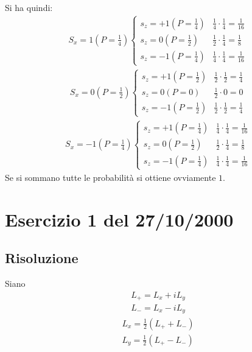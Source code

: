 Si ha quindi:
\begin{equation}\begin{split}
S_x=1 \left(P=\frac{1}{4}\right)
\begin{cases}
s_z=+1 \left(P=\frac{1}{4}\right)&\frac{1}{4}\cdot \frac{1}{4}=\frac{1}{16} \\
s_z=0 \left(P=\frac{1}{2}\right)&\frac{1}{2}\cdot \frac{1}{4}=\frac{1}{8} \\
s_z=-1 \left(P=\frac{1}{4}\right)&\frac{1}{4}\cdot \frac{1}{4}=\frac{1}{16}
\end{cases}
\end{split}\end{equation}
\begin{equation}\begin{split}
S_x=0 \left(P=\frac{1}{2}\right)
\begin{cases}
s_z=+1 \left(P=\frac{1}{2}\right)&\frac{1}{2}\cdot \frac{1}{2}=\frac{1}{4}\\
s_z=0 \left(P=0\right)&\frac{1}{2}\cdot 0=0\\
s_z=-1 \left(P=\frac{1}{2}\right)&\frac{1}{2}\cdot \frac{1}{2}=\frac{1}{4}
\end{cases}
\end{split}\end{equation}
\begin{equation}\begin{split}
S_x=-1 \left(P=\frac{1}{4}\right)
\begin{cases}
s_z=+1 \left(P=\frac{1}{4}\right)&\frac{1}{4}\cdot \frac{1}{4}=\frac{1}{16}\\
s_z=0 \left(P=\frac{1}{2}\right)&\frac{1}{2}\cdot \frac{1}{4}=\frac{1}{8}\\
s_z=-1 \left(P=\frac{1}{4}\right)&\frac{1}{4}\cdot \frac{1}{4}=\frac{1}{16}
\end{cases}
\end{split}\end{equation}
Se si sommano tutte le probabilità si ottiene ovviamente $1$.

\section{Esercizio 1 del 27/10/2000} %

\subsection{Risoluzione} %
Siano
\begin{equation}\begin{split}
L_+=L_x+iL_y \\
L_-=L_x-iL_y
\end{split}\end{equation}
\begin{equation}\begin{split}
L_x=\frac{1}{2}\left(L_++L_-\right)\\
L_y=\frac{1}{2}\left(L_+-L_-\right)
\end{split}\end{equation}

